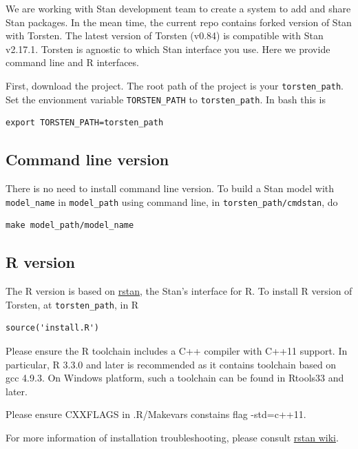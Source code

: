 \documentclass[11pt, reqno]{amsbook}
\numberwithin{section}{chapter}
\theoremstyle{remark}
\begin{document}
We are working with Stan development team to create a
system to add and share Stan packages. In the mean time,
the current repo contains forked version of Stan with
Torsten. The latest version of Torsten (v0.84) is
compatible with Stan v2.17.1. Torsten is agnostic to which
Stan interface you use. Here we provide command line and R
interfaces.

First, download the project. The root path of the project is
your \texttt{torsten\_path}. Set the envionment variable
\texttt{TORSTEN_PATH}
to \texttt{torsten\_path}. In bash this is 

\begin{verbatim}
export TORSTEN_PATH=torsten_path
\end{verbatim}

\subsection*{Command line version}
\label{sec:orgf244a93}
There is no need to install command line version. To
build a Stan model with \texttt{model\_name} in \texttt{model\_path}
using command line, in \texttt{torsten\_path/cmdstan}, do
\begin{verbatim}
make model_path/model_name
\end{verbatim}

\subsection*{R version}
\label{sec:org1dd4a96}
The R version is based on \href{https://cran.r-project.org/web/packages/rstan/index.html}{rstan}, the Stan's interface for
R. To install R version of Torsten, at \texttt{torsten\_path}, in R
\begin{verbatim}
source('install.R')
\end{verbatim}

Please ensure the R toolchain includes a C++ compiler with
C++11 support. In particular, R 3.3.0 and later is
recommended as it contains toolchain based on gcc 4.9.3. On
Windows platform, such a toolchain can be found in Rtools33 and later.

Please ensure CXXFLAGS in .R/Makevars constains flag
-std=c++11. 

For more information of installation troubleshooting,
please consult \href{https://github.com/stan-dev/rstan/wiki}{rstan wiki}.
\end{document}
